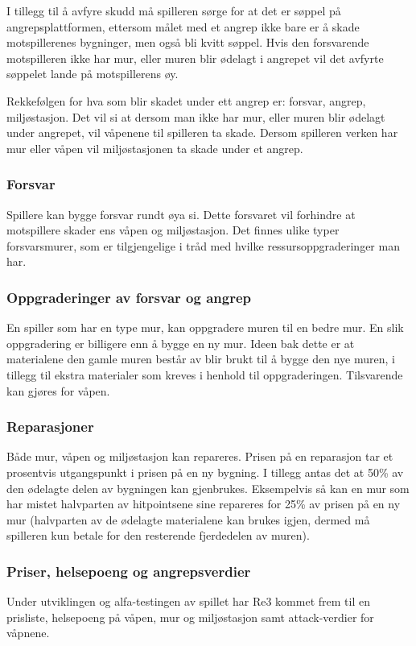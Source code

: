 I tillegg til å avfyre skudd må spilleren sørge for at det er søppel på angrepsplattformen, ettersom målet med et angrep ikke bare er å skade motspillerenes bygninger, men også bli kvitt søppel. Hvis den forsvarende motspilleren ikke har mur, eller muren blir ødelagt i angrepet vil det avfyrte søppelet lande på motspillerens øy.

Rekkefølgen for hva som blir skadet under ett angrep er: forsvar, angrep, miljøstasjon. Det vil si at dersom man ikke har mur, eller muren blir ødelagt under angrepet, vil våpenene til spilleren ta skade. Dersom spilleren verken har mur eller våpen vil miljøstasjonen ta skade under et angrep. 


\subsubsection{Forsvar}
Spillere kan bygge forsvar rundt øya si. Dette forsvaret vil forhindre at motspillere skader ens våpen og miljøstasjon. Det finnes ulike typer forsvarsmurer, som er tilgjengelige i tråd med hvilke ressursoppgraderinger man har. 


\subsubsection{Oppgraderinger av forsvar og angrep}
En spiller som har en type mur, kan oppgradere muren til en bedre mur. En slik oppgradering er billigere enn å bygge en ny mur. Ideen bak dette er at materialene den gamle muren består av blir brukt til å bygge den nye muren, i tillegg til ekstra materialer som kreves i henhold til oppgraderingen. Tilsvarende kan gjøres for våpen.


\subsubsection{Reparasjoner}
Både mur, våpen og miljøstasjon kan repareres. Prisen på en reparasjon tar et prosentvis utgangspunkt i prisen på en ny bygning. I tillegg antas det at 50\% av den ødelagte delen av bygningen kan gjenbrukes. Eksempelvis så kan en mur som har mistet halvparten av hitpointsene sine repareres for 25\% av prisen på en ny mur (halvparten av de ødelagte materialene kan brukes igjen, dermed må spilleren kun betale for den resterende fjerdedelen av muren).


\subsubsection{Priser, helsepoeng og angrepsverdier}
Under utviklingen og alfa-testingen av spillet har Re3 kommet frem til en prisliste, helsepoeng på våpen, mur og miljøstasjon samt attack-verdier for våpnene.

